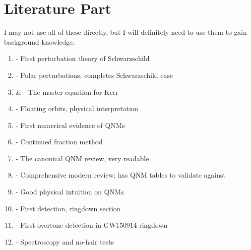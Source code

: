 \documentclass[12pt]{article}
\begin{document}
\section{Literature Part}
\label{Lit}
I may not use all of these directly, but I will definitely need to use them to gain background knowledge.
\begin{enumerate}
    \item \cite{ReggeWheeler1957} - First perturbation theory of Schwarzschild
    \item \cite{Zerilli1970} - Polar perturbations, completes Schwarzschild case
    \item \cite{Teukolsky1972} \& \cite{Teukolsky1973} - The master equation for Kerr
    \item \cite{PressTeukolsky1973} - Floating orbits, physical interpretation
    \item \cite{Vishveshwara1970} - First numerical evidence of QNMs
    \item \cite{Leaver1985} - Continued fraction method
    \item \cite{KokkotasSchmidt1999} - The canonical QNM review, very readable
    \item \cite{BertiCardosoStarinets2009} - Comprehensive modern review; has QNM tables to validate against
    \item \cite{Nollert1999} - Good physical intuition on QNMs
    \item \cite{GW150914} - First detection, ringdown section
    \item \cite{Isi2019} - First overtone detection in GW150914 ringdown
    \item \cite{CotaescuGazeau} - Spectroscopy and no-hair tests
\end{enumerate}
\end{document}
